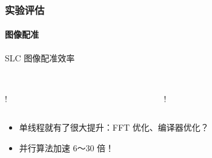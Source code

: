 \documentclass{beamer}
\begin{document}
\begin{frame}
    \frametitle{实验评估}
    \framesubtitle{图像配准}

    SLC 图像配准效率 \\~\\
    \begin{columns}
        \begin{column}{0.5\textwidth}
            \centering
            \resizebox {\textwidth} {!} {
                
            }
        \end{column}
        \begin{column}{0.5\textwidth}
            \centering
            \resizebox {\textwidth} {!} {
                
            }
        \end{column}
    \end{columns}

    \begin{itemize}
        \small
        \setlength\itemsep{-0.1em}
        \item 单线程就有了很大提升：FFT 优化、编译器优化？
        \item 并行算法加速 6～30 倍！
    \end{itemize}
\end{frame}
\end{document}
